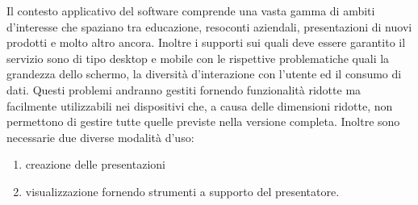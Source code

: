 Il contesto applicativo del software comprende una vasta gamma di ambiti d'interesse che spaziano tra educazione, resoconti aziendali, presentazioni di nuovi prodotti e molto altro ancora.
Inoltre i supporti sui quali deve essere garantito il servizio sono di tipo desktop e mobile con le rispettive problematiche quali la grandezza dello schermo, la diversità d’interazione con l’utente ed il consumo di dati. Questi problemi andranno gestiti fornendo funzionalità ridotte ma facilmente utilizzabili nei dispositivi che, a causa delle dimensioni ridotte, non permettono di gestire tutte quelle previste nella versione completa.
Inoltre sono necessarie due diverse modalità d’uso:
\begin{enumerate}
  \item creazione delle presentazioni
  \item visualizzazione fornendo strumenti a supporto del presentatore.
\end{enumerate}
